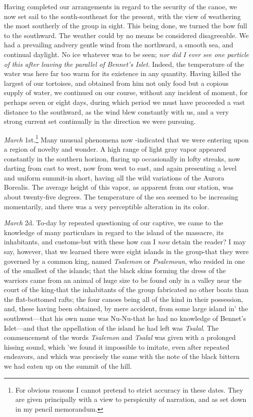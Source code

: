 Having completed our arrangements in regard to the security of the canoe, we
now set sail to the south-southeast for the present, with the view of weathering
the most southerly of the group in sight. This being done, we turned the bow
full to the southward. The weather could by no means be considered disagreeable.
We had a prevailing andvery gentle wind from the northward, a smooth sea, and
continual daylight. No ice whatever was to be seen; \emph{nor did I ever see one
particle of this after leaving the parallel of Bennet's Islet}. Indeed, the
temperature of the water was here far too warm for its existence in any
quantity. Having killed the largest of our tortoises, and obtained from him not
only food but a copious supply of water, we continued on our course, without any
incident of moment, for perhaps seven or eight days, during which period we must
have proceeded a vast distance to the southward, as the wind blew constantly
with us, and a very strong current set continually in the direction we were
pursuing. 

\emph{March} 1st.\footnote{For obvious
reasons I cannot pretend to strict accuracy in these dates. They are given
principally with a view to perspicuity of narration, and as set down in my
pencil memorandum.} 
Many unusual phenomena now -indicated
that we were entering upon a region of novelty and wonder. A high range of light
gray vapor appeared constantly in the southern horizon, flaring up occasionally
in lofty streaks, now darting from cast to west, now from west to east, and
again presenting a level and uniform summit-in short, having all the wild
variations of the Aurora Borealis. The average height of this vapor, as apparent
from our station, was about twenty-five degrees. The temperature of the sea
seemed to be increasing momentarily, and there was a very perceptible alteration
in its color. 

\emph{March} 2d. To-day by repeated questioning of our captive, we came to
the knowledge of many particulars in regard to the island of the massacre, its
inhabitants, and customs-but with these how can I \emph{now} detain the reader?
I may say, however, that we learned there were eight islands in the group-that
they were governed by a common king, named \emph{Tsalemon} or \emph{Psalemoun},
who resided in one of the smallest of the islands; that the black skins forming
the dress of the warriors came from an animal of huge size to be found only in a
valley near the court of the king-that the inhabitants of the group fabricated
no other boats than the flat-bottomed rafts; the four canoes being all of the
kind in their possession, and, these having been obtained, by mere accident,
from some large island in' the southwest---that his own name was Nu-Nu-that he
had no knowledge of Bennet's Islet---and that the appellation of the island he
had left was \emph{Tsalal}. The commencement of the words \emph{Tsalemon} and
\emph{Tsalal} was given with a prolonged hissing sound, which 'we found it
impossible to imitate, even after repeated endeavors, and which was precisely
the same with the note of the black bittern we had eaten up on the summit of the
hill. 

